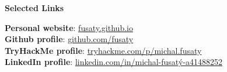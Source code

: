 \documentclass[12pt]{article}
\begin{document}
\vspace{8pt} %

\begin{center}
	{\noindent \bfseries Selected Links}
\end{center} 

\vspace{0.1pt}

\noindent
{\bfseries Personal website}:
\href{https://fusaty.github.io/}{fusaty.github.io} \\[0.04in]
{\bfseries Github profile}: \href{https://github.com/fusaty}{github.com/fusaty} \\[0.04in]
{\bfseries TryHackMe profile}: \href{https://tryhackme.com/p/michal.fusaty}{tryhackme.com/p/michal.fusaty} \\[0.04in]
{\bfseries LinkedIn profile}: \href{https://linkedin.com/in/michal-fusatý-a41488252}{linkedin.com/in/michal-fusatý-a41488252} \\[0.04in]




\end{document}
